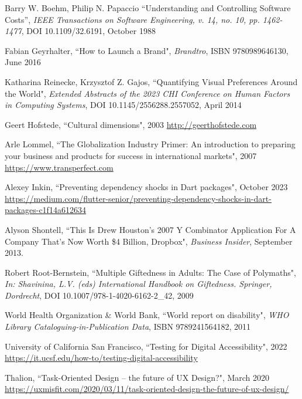 \begin{thebibliography}{100}
 Barry W. Boehm, Philip N. Papaccio ``Understanding and Controlling Software Costs”,
\emph{IEEE Transactions on Software Engineering, v. 14, no. 10, pp. 1462-1477}, DOI 10.1109/32.6191, October 1988

 Fabian Geyrhalter, ``How to Launch a Brand", \emph{Brandtro}, ISBN 9780989646130, June 2016

 Katharina Reinecke, Krzysztof Z. Gajos, ``Quantifying Visual Preferences Around the World", 
\emph{Extended Abstracts of the 2023 CHI Conference on Human Factors in Computing Systems}, DOI 10.1145/2556288.2557052, 
April 2014

 Geert Hofstede, ``Cultural dimensions", 2003 \href{http://geerthofstede.com}{http://geerthofstede.com}

 Arle Lommel, ``The Globalization Industry Primer: An introduction to preparing your
business and products for success in international markets", 2007
\href{https://marketing.transperfect.com/acton/attachment/687/f-0f09/1/-/-/-/-/lisa_globalization_primer.pdf}{https://www.transperfect.com}

 Alexey Inkin, ``Preventing dependency shocks in Dart packages", October 2023
\href{https://medium.com/flutter-senior/preventing-dependency-shocks-in-dart-packages-c1f14a612634}{https://medium.com/flutter-senior/preventing-dependency-shocks-in-dart-packages-c1f14a612634}

 Alyson Shontell, ``This Is Drew Houston's 2007 Y Combinator Application For A Company 
That's Now Worth \$4 Billion, Dropbox", \emph{Business Insider}, September 2013.

 Robert Root-Bernstein, ``Multiple Giftedness in Adults: The Case of Polymaths", 
\emph{In: Shavinina, L.V. (eds) International Handbook on Giftedness. Springer, Dordrecht}, 
DOI 10.1007/978-1-4020-6162-2\_42, 2009

 World Health Organization \& World Bank, ``World report on disability",
\emph{WHO Library Cataloguing-in-Publication Data}, ISBN 9789241564182, 2011

 University of California San Francisco, ``Testing for Digital Accessibility", 2022
\href{https://it.ucsf.edu/how-to/testing-digital-accessibility}{https://it.ucsf.edu/how-to/testing-digital-accessibility}

 Thalion, ``Task-Oriented Design -- the future of UX Design?", March 2020
\href{https://uxmisfit.com/2020/03/11/task-oriented-design-the-future-of-ux-design/}{https://uxmisfit.com/2020/03/11/task-oriented-design-the-future-of-ux-design/}


\end{thebibliography}
